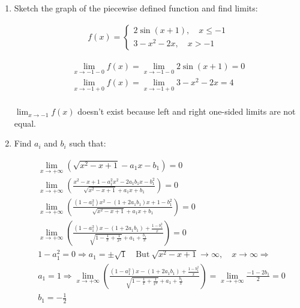 \documentclass{article}
\begin{document}
\begin{enumerate}
\item Sketch the graph of the piecewise defined function and find limits:

\begin{align*}
f(x)=
\begin{cases}
2\sin{(x+1)}, \quad x \leq -1\\
3 - x^2 - 2x, \quad x > -1
\end{cases}
\end{align*}


\begin{align*}
\lim_{x \to -1-0} f(x) = \lim_{x \to -1-0} 2\sin{(x+1)} = 0\\
\lim_{x \to -1+0} f(x) = \lim_{x \to -1+0} 3 - x^2 - 2x = 4\\
\end{align*}

$\lim_{x \to -1} f(x)$ doesn't exist because left and right one-sided limits are not equal.
\newpage
\item Find $a_i$ and $b_i$ such that:

\begin{align*}
&\lim_{x \to +\infty} (\sqrt{x^2-x+1} - a_1 x - b_1) = 0\\
&\lim_{x \to +\infty} (\frac{x^2-x+1 - a_1^2 x^2 - 2a_1b_1x - b_1^2}{\sqrt{x^2-x+1} + a_1 x + b_1}) = 0\\
&\lim_{x \to +\infty} (\frac{(1-a_1^2)x^2 - (1 + 2a_1b_1)x + 1 - b_1^2}{\sqrt{x^2-x+1} + a_1 x + b_1}) = 0\\
&\lim_{x \to +\infty} (\frac{(1-a_1^2)x - (1 + 2a_1b_1) + \frac{1 - b_1^2}{x}}{\sqrt{1-\frac{1}{x}+\frac{1}{x^2}} + a_1 + \frac{b_1}{x}}) = 0\\
&1-a_1^2 = 0 \Rightarrow a_1 = \pm \sqrt{1} \quad \text{But} \: \sqrt{x^2-x+1} \to \infty, \quad x \to \infty \Rightarrow\\
&a_1 = 1 \Rightarrow \lim_{x \to +\infty} (\frac{(1-a_1^2)x - (1 + 2a_1b_1) + \frac{1 - b_1^2}{x}}{\sqrt{1-\frac{1}{x}+\frac{1}{x^2}} + a_1 + \frac{b_1}{x}}) = \lim_{x \to +\infty} \frac{-1 - 2b_1}{2} = 0\\
&b_1 = -\frac{1}{2}
\end{align*}


\end{enumerate}
\end{document}

